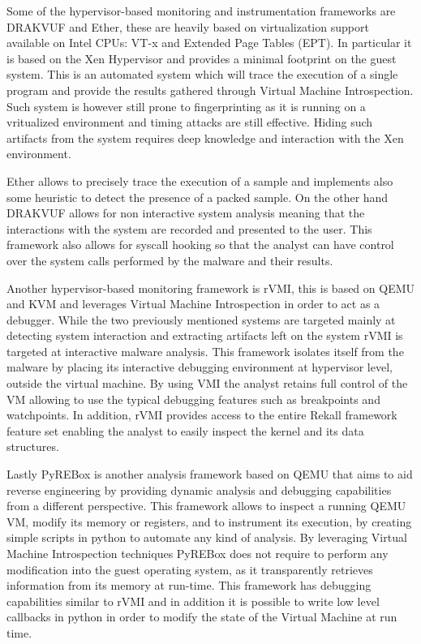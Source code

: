 Some of the hypervisor-based monitoring and instrumentation frameworks are DRAKVUF and Ether, these are heavily based on virtualization support available on Intel CPUs: VT-x and Extended Page Tables (EPT). In particular it is based on the Xen Hypervisor and provides a minimal footprint on the guest system. This is an automated system which will trace the execution of a single program and provide the results gathered through Virtual Machine Introspection. Such system is however still prone to fingerprinting as it is running on a vritualized environment and timing attacks are still effective. Hiding such artifacts from the system requires deep knowledge and interaction with the Xen environment. 

Ether allows to precisely trace the execution of a sample and implements also some heuristic to detect the presence of a packed sample. On the other hand DRAKVUF allows for non interactive system analysis meaning that the interactions with the system are recorded and presented to the user. This framework also allows for syscall hooking so that the analyst can have control over the system calls performed by the malware and their results. 

Another hypervisor-based monitoring framework is rVMI, this is based on QEMU and KVM and leverages Virtual Machine Introspection in order to act as a debugger. While the two previously mentioned systems are targeted mainly at detecting system interaction and extracting artifacts left on the system rVMI is targeted at interactive malware analysis. This framework isolates itself from the malware by placing its interactive debugging environment at hypervisor level, outside the virtual machine. By using VMI the analyst retains full control of the VM allowing to use the typical debugging features such as breakpoints and watchpoints.  In addition, rVMI provides access to the entire Rekall framework feature set enabling the analyst to easily inspect the kernel and its data structures.

Lastly PyREBox is another analysis framework based on QEMU that aims to aid reverse engineering by providing dynamic analysis and debugging capabilities from a different perspective. This framework allows to inspect a running QEMU VM, modify its memory or registers, and to instrument its execution, by creating simple scripts in python to automate any kind of analysis. By leveraging Virtual Machine Introspection techniques PyREBox does not require to perform any modification into the guest operating system, as it transparently retrieves information from its memory at run-time. This framework has debugging capabilities similar to rVMI and in addition it is possible to write low level callbacks in python in order to modify the state of the Virtual Machine at run time. 


